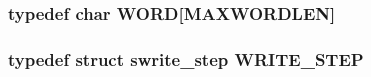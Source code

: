 \subsubsection{\setlength{\rightskip}{0pt plus 5cm}typedef char {\bf WORD}[MAXWORDLEN]}\label{include_2md__typedef_8h_ab6088473a29f3e9a28199c4adcc7373}


\subsubsection{\setlength{\rightskip}{0pt plus 5cm}typedef struct {\bf swrite\_\-step}  {\bf WRITE\_\-STEP}}\label{include_2md__typedef_8h_c0eec1beccb2a80af327c92826b439ae}


